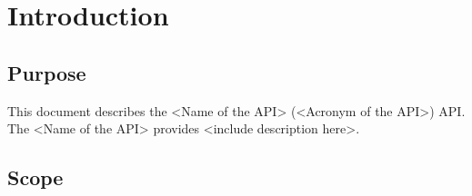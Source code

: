 %
% 

\chapter{Introduction} 
\rm

\section{Purpose}

This document describes the <Name of the API> (<Acronym of the API>) API. The <Name of the API> provides <include description here>.


\section{Scope}

